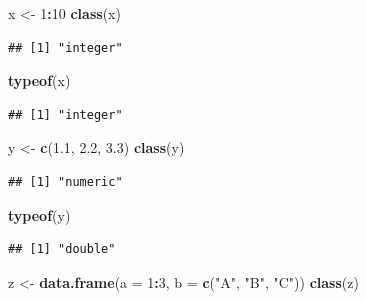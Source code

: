 \documentclass[
]{book}
\newenvironment{Shaded}{\begin{snugshade}}{\end{snugshade}}
\newcommand{\AttributeTok}[1]{\textcolor[rgb]{0.13,0.29,0.53}{#1}}
\newcommand{\DecValTok}[1]{\textcolor[rgb]{0.00,0.00,0.81}{#1}}
\newcommand{\FloatTok}[1]{\textcolor[rgb]{0.00,0.00,0.81}{#1}}
\newcommand{\FunctionTok}[1]{\textcolor[rgb]{0.13,0.29,0.53}{\textbf{#1}}}
\newcommand{\NormalTok}[1]{#1}
\newcommand{\OtherTok}[1]{\textcolor[rgb]{0.56,0.35,0.01}{#1}}
\newcommand{\SpecialCharTok}[1]{\textcolor[rgb]{0.81,0.36,0.00}{\textbf{#1}}}
\newcommand{\StringTok}[1]{\textcolor[rgb]{0.31,0.60,0.02}{#1}}
\begin{document}
\begin{Shaded}
\begin{Highlighting}[]
\NormalTok{x }\OtherTok{\textless{}{-}} \DecValTok{1}\SpecialCharTok{:}\DecValTok{10}
\FunctionTok{class}\NormalTok{(x) }
\end{Highlighting}
\end{Shaded}

\begin{verbatim}
## [1] "integer"
\end{verbatim}

\begin{Shaded}
\begin{Highlighting}[]
\FunctionTok{typeof}\NormalTok{(x) }
\end{Highlighting}
\end{Shaded}

\begin{verbatim}
## [1] "integer"
\end{verbatim}

\begin{Shaded}
\begin{Highlighting}[]
\NormalTok{y }\OtherTok{\textless{}{-}} \FunctionTok{c}\NormalTok{(}\FloatTok{1.1}\NormalTok{, }\FloatTok{2.2}\NormalTok{, }\FloatTok{3.3}\NormalTok{)}
\FunctionTok{class}\NormalTok{(y) }
\end{Highlighting}
\end{Shaded}

\begin{verbatim}
## [1] "numeric"
\end{verbatim}

\begin{Shaded}
\begin{Highlighting}[]
\FunctionTok{typeof}\NormalTok{(y) }
\end{Highlighting}
\end{Shaded}

\begin{verbatim}
## [1] "double"
\end{verbatim}

\begin{Shaded}
\begin{Highlighting}[]
\NormalTok{z }\OtherTok{\textless{}{-}} \FunctionTok{data.frame}\NormalTok{(}\AttributeTok{a =} \DecValTok{1}\SpecialCharTok{:}\DecValTok{3}\NormalTok{, }\AttributeTok{b =} \FunctionTok{c}\NormalTok{(}\StringTok{"A"}\NormalTok{, }\StringTok{"B"}\NormalTok{, }\StringTok{"C"}\NormalTok{))}
\FunctionTok{class}\NormalTok{(z) }
\end{Highlighting}
\end{Shaded}
\end{document}
